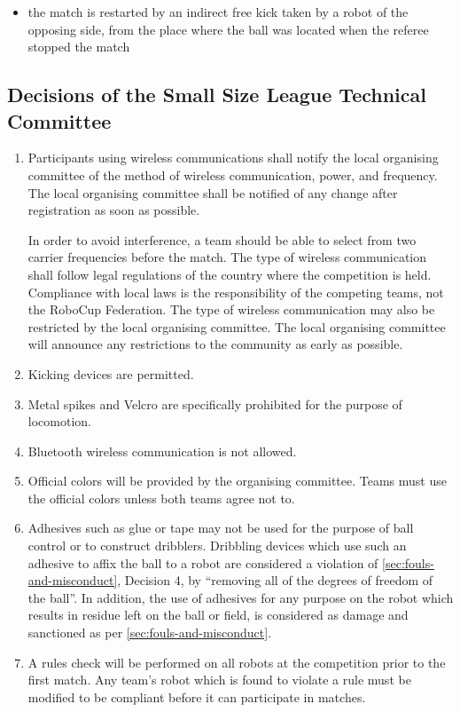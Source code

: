 \begin{itemize}
\item the match is restarted by an indirect free kick taken by a robot of the opposing side, from the place where the ball was located when the referee stopped the match
\end{itemize}

\subsection*{Decisions of the Small Size League Technical Committee}
\begin{enumerate}
\item
Participants using wireless communications shall notify the local organising committee of the method of wireless communication, power, and frequency.
The local organising committee shall be notified of any change after registration as soon as possible.

In order to avoid interference, a team should be able to select from two carrier frequencies before the match.
The type of wireless communication shall follow legal regulations of the country where the competition is held.
Compliance with local laws is the responsibility of the competing teams, not the RoboCup Federation.
The type of wireless communication may also be restricted by the local organising committee.
The local organising committee will announce any restrictions to the community as early as possible.

\item
Kicking devices are permitted.

\item
Metal spikes and Velcro are specifically prohibited for the purpose of locomotion.

\item
Bluetooth wireless communication is not allowed.

\item
Official colors will be provided by the organising committee.
Teams must use the official colors unless both teams agree not to.

\item
Adhesives such as glue or tape may not be used for the purpose of ball control or to construct dribblers.
Dribbling devices which use such an adhesive to affix the ball to a robot are considered a violation of \autoref{sec:fouls-and-misconduct}, Decision 4, by ``removing all of the degrees of freedom of the ball''.
In addition, the use of adhesives for any purpose on the robot which results in residue left on the ball or field, is considered as damage and sanctioned as per \autoref{sec:fouls-and-misconduct}.

\item
A rules check will be performed on all robots at the competition prior to the first match.
Any team's robot which is found to violate a rule must be modified to be compliant before it can participate in matches.

\end{enumerate}
